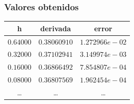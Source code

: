 \documentclass[12pt]{beamer}
\begin{document}
\begin{frame}
\frametitle{Valores obtenidos}
\begin{table}
\renewcommand{\arraystretch}{0.9}
\centering
\begin{tabular}{c c c}
h & derivada & error \\ \hline
$0.64000$ & $0.38060910$ & $1.272966e-02$ \\ \hline
$0.32000$ & $0.37102941$ & $3.149974e-03$ \\ \hline
$0.16000$ & $0.36866492$ & $7.854807e-04$ \\ \hline
$0.08000$ & $0.36807569$ & $1.962454e-04$ \\ \hline
\ldots & \ldots & \ldots \\ \hline
\end{tabular}    
\end{table}
\end{frame}
\end{document}
